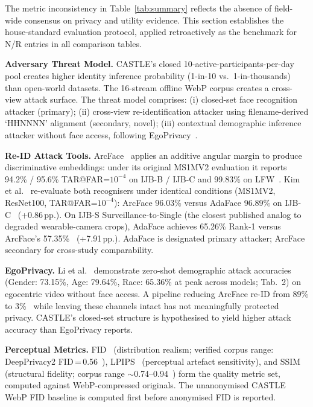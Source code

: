 \documentclass[10pt, twocolumn]{IEEEtran}
\begin{document}
The metric inconsistency in Table~\ref{tab:summary} reflects the absence of field-wide consensus on privacy and utility evidence. This section establishes the house-standard evaluation protocol, applied retroactively as the benchmark for N/R entries in all comparison tables.

\textbf{Adversary Threat Model.} CASTLE's closed 10-active-participants-per-day pool creates higher identity inference probability (1-in-10 vs.\ 1-in-thousands) than open-world datasets. The 16-stream offline WebP corpus creates a cross-view attack surface. The threat model comprises: (i) closed-set face recognition attacker (primary); (ii) cross-view re-identification attacker using filename-derived `HHNNNN' alignment (secondary, novel); (iii) contextual demographic inference attacker without face access, following EgoPrivacy~\cite{li2025egoprivacy}.

\textbf{Re-ID Attack Tools.} ArcFace~\cite{deng2019arcface} applies an additive angular margin to produce discriminative embeddings: under its original MS1MV2 evaluation it reports 94.2\% / 95.6\% TAR@FAR=$10^{-4}$ on IJB-B / IJB-C and 99.83\% on LFW~\cite{deng2019arcface}. Kim et al.~\cite{kim2022adaface} re-evaluate both recognisers under identical conditions (MS1MV2, ResNet100, TAR@FAR=$10^{-4}$): ArcFace 96.03\% versus AdaFace 96.89\% on IJB-C~\cite{kim2022adaface} (+0.86\,pp.). On IJB-S Surveillance-to-Single (the closest published analog to degraded wearable-camera crops), AdaFace achieves 65.26\% Rank-1 versus ArcFace's 57.35\%~\cite{kim2022adaface} (+7.91\,pp.). AdaFace is designated primary attacker; ArcFace secondary for cross-study comparability.

\textbf{EgoPrivacy.} Li et al.~\cite{li2025egoprivacy} demonstrate zero-shot demographic attack accuracies (Gender: 73.15\%, Age: 79.64\%, Race: 65.36\% at peak across models; Tab.~2) on egocentric video without face access. A pipeline reducing ArcFace re-ID from 89\% to 3\%~\cite{khorzooghi2023gan} while leaving these channels intact has not meaningfully protected privacy. CASTLE's closed-set structure is hypothesised to yield higher attack accuracy than EgoPrivacy reports.

\textbf{Perceptual Metrics.} FID~\cite{heusel2017fid} (distribution realism; verified corpus range: DeepPrivacy2 FID\,=\,0.56~\cite{hukkelas2023deepprivacy2}), LPIPS~\cite{zhang2018lpips} (perceptual artefact sensitivity), and SSIM~\cite{wang2004ssim} (structural fidelity; corpus range $\sim$0.74--0.94~\cite{meden2023cppdeidentification,muhammad2026refacex}) form the quality metric set, computed against WebP-compressed originals. The unanonymised CASTLE WebP FID baseline is computed first before anonymised FID is reported.
\end{document}
